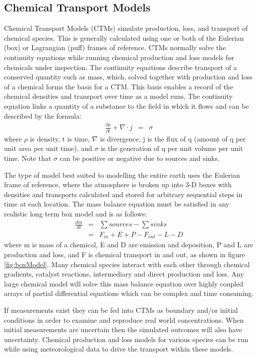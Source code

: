 \subsection{Chemical Transport Models}
Chemical Transport Models (CTMs) simulate production, loss, and transport of chemical species.
This is generally calculated using one or both of the Eulerian (box) or Lagrangian (puff) frames of reference.
CTMs normally solve the continuity equations while running chemical production and loss models for chemicals under inspection. 
The continuity equations describe transport of a conserved quantity such as mass, which, solved together with production and loss of a chemical forms the basis for a CTM.
This basis enables a record of the chemical densities and transport over time as a model runs.
The continuity equation links a quantity of a substance to the field in which it flows and can be described by the formula:
\begin{eqnarray*}
    \frac{\partial \rho}{\partial t} + \nabla \cdot j &=& \sigma 
\end{eqnarray*}
where $\rho$ is density, t is time, $\nabla$ is divergence, j is the flux of q (amount of q per unit area per unit time), and $\sigma$ is the generation of q per unit volume per unit time.
Note that $\sigma$ can be positive or negative due to sources and sinks.

The type of model best suited to modelling the entire earth uses the Eulerian frame of reference, where the atmosphere is broken up into 3-D boxes with densities and transports calculated and stored for arbitrary sequential steps in time at each location.
The mass balance equation must be satisfied in any realistic long term box model and is as follows: 
\begin{eqnarray*}
    \frac{dm}{dt} &=& \sum{sources}-\sum{sinks} \\
    &=& F_{in} + E + P - F_{out} - L - D 
\end{eqnarray*}
where m is mass of a chemical, E and D are emission and deposition, P and L are production and loss, and F is chemical transport in and out, as shown in figure \ref{fig:boxModel}.
Many chemical species interact with each other through chemical gradients, catalyst reactions, intermediary and direct production and loss. 
Any large chemical model will solve this mass balance equation over highly coupled arrays of partial differential equations which can be complex and time consuming.

If measurements exist they can be fed into CTMs as boundary and/or initial conditions in order to examine and reproduce real world concentrations.
When initial measurements are uncertain then the simulated outcomes will also have uncertainty.
Chemical production and loss models for various species can be run while using meteorological data to drive the transport within these models.


